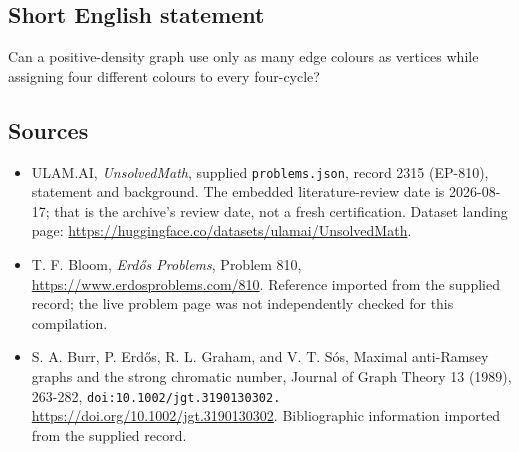 \documentclass[11pt,a4paper]{article}
\begin{document}
\subsection{Short English statement}

Can a positive-density graph use only as many edge colours as vertices while assigning four different colours to every four-cycle?

\subsection{Sources}

{\small

\begin{itemize}

\item[\hypertarget{source:2315:1}{S1}] ULAM.AI, \emph{UnsolvedMath}, supplied \texttt{problems.json}, record 2315 (EP-810), statement and background. The embedded literature-review date is 2026-08-17; that is the archive’s review date, not a fresh certification. Dataset landing page: \url{https://huggingface.co/datasets/ulamai/UnsolvedMath}.

\item[\hypertarget{source:2315:2}{S2}] T. F. Bloom, \emph{Erdős Problems}, Problem 810, \url{https://www.erdosproblems.com/810}. Reference imported from the supplied record; the live problem page was not independently checked for this compilation.

\item[\hypertarget{source:2315:3}{S3}] S. A. Burr, P. Erdős, R. L. Graham, and V. T. Sós, Maximal anti-Ramsey graphs and the strong chromatic number, Journal of Graph Theory 13 (1989), 263-282, \nolinkurl{doi:10.1002/jgt.3190130302.} \url{https://doi.org/10.1002/jgt.3190130302}. Bibliographic information imported from the supplied record.

\end{itemize}

}

\label{end:2315}
\end{document}
